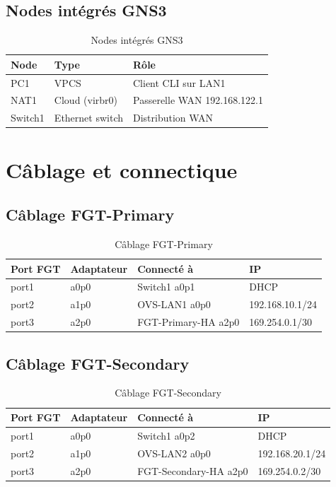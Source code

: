 \subsection{Nodes intégrés GNS3}

\begin{table}[H]
\centering
\caption{Nodes intégrés GNS3}
\label{tab:builtin-specs}
\begin{tabularx}{\textwidth}{|l|l|X|}
\hline
\textbf{Node} & \textbf{Type} & \textbf{Rôle} \\
\hline
PC1 & VPCS & Client CLI sur LAN1 \\
NAT1 & Cloud (virbr0) & Passerelle WAN 192.168.122.1 \\
Switch1 & Ethernet switch & Distribution WAN \\
\hline
\end{tabularx}
\end{table}

\section{Câblage et connectique}

\subsection{Câblage FGT-Primary}

\begin{table}[H]
\centering
\caption{Câblage FGT-Primary}
\label{tab:cable-fgtp}
\begin{tabularx}{\textwidth}{|l|l|l|X|}
\hline
\textbf{Port FGT} & \textbf{Adaptateur} & \textbf{Connecté à} & \textbf{IP} \\
\hline
port1 & a0p0 & Switch1 a0p1 & DHCP \\
port2 & a1p0 & OVS-LAN1 a0p0 & 192.168.10.1/24 \\
port3 & a2p0 & FGT-Primary-HA a2p0 & 169.254.0.1/30 \\
\hline
\end{tabularx}
\end{table}

\subsection{Câblage FGT-Secondary}

\begin{table}[H]
\centering
\caption{Câblage FGT-Secondary}
\label{tab:cable-fgts}
\begin{tabularx}{\textwidth}{|l|l|l|X|}
\hline
\textbf{Port FGT} & \textbf{Adaptateur} & \textbf{Connecté à} & \textbf{IP} \\
\hline
port1 & a0p0 & Switch1 a0p2 & DHCP \\
port2 & a1p0 & OVS-LAN2 a0p0 & 192.168.20.1/24 \\
port3 & a2p0 & FGT-Secondary-HA a2p0 & 169.254.0.2/30 \\
\hline
\end{tabularx}
\end{table}

